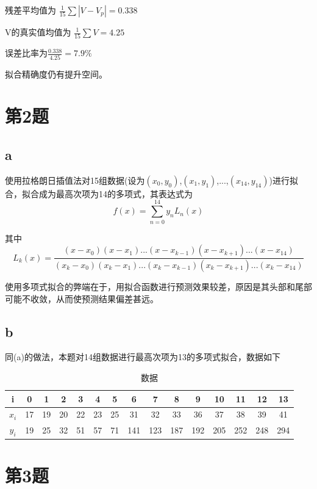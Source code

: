 \documentclass{article}
\begin{document}
残差平均值为
$\frac{1}{15} \sum|V-V_p| = 0.338$

V的真实值均值为
$\frac{1}{15} \sum V = 4.25$

误差比率为$\frac{0.338}{4.25} = 7.9\%$

拟合精确度仍有提升空间。

\newpage


\section{第2题}

\subsection{a}
使用拉格朗日插值法对15组数据(设为$(x_0,y_0)$,$(x_1,y_1)$,...,$(x_{14},y_{14})$)进行拟合，拟合成为最高次项为14的多项式，其表达式为
\[f(x) = \sum_{n=0}^{14} y_n L_n(x)\]

其中
\[L_k(x) = \frac{(x-x_0)(x-x_1)...(x-x_{k-1})(x-x_{k+1})...(x-x_{14})}{(x_k-x_0)(x_k-x_1)...(x_k-x_{k-1})(x_k-x_{k+1})...(x_k-x_{14})}\]

使用多项式拟合的弊端在于，用拟合函数进行预测效果较差，原因是其头部和尾部可能不收敛，从而使预测结果偏差甚远。

\subsection{b}
同(a)的做法，本题对14组数据进行最高次项为13的多项式拟合，数据如下

\begin{table}[!h]
\begin{center}
\begin{tabular}{c|c c c c c c c c c c c c c c}
    
    i & 0 & 1 & 2 & 3 & 4 & 5 & 6 & 7 & 8 & 9 & 10 & 11 & 12 & 13 \\
    \hline
    $x_i$ & 17 & 19 & 20 & 22 & 23 & 25 & 31 & 32 & 33 & 36 & 37 & 38 & 39 & 41  \\
    
    $y_i$ &  19 & 25 & 32 & 51 & 57 & 71 & 141 & 123 & 187 & 192 & 205 & 252 & 248 & 294  \\
    
\end{tabular}
\caption{\label{demo-table}数据}
\end{center}
\end{table}


\section{第3题}
\end{document}
